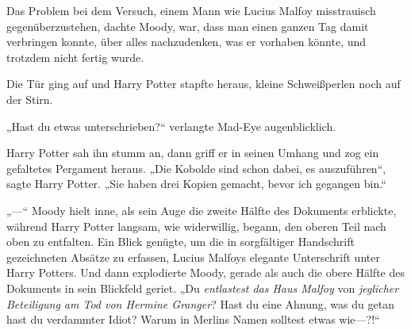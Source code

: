 Das Problem bei dem Versuch, einem Mann wie Lucius Malfoy misstrauisch gegenüberzustehen, dachte Moody, war, dass man einen ganzen Tag damit verbringen konnte, über alles nachzudenken, was er vorhaben könnte, und trotzdem nicht fertig wurde.

Die Tür ging auf und Harry Potter stapfte heraus, kleine Schweißperlen noch auf der Stirn.

„Hast du etwas unterschrieben?“ verlangte Mad-Eye augenblicklich.

Harry Potter sah ihn stumm an, dann griff er in seinen Umhang und zog ein gefaltetes Pergament heraus. „Die Kobolde sind schon dabei, es auszuführen“, sagte Harry Potter. „Sie haben drei Kopien gemacht, bevor ich gegangen bin.“

„—“
Moody hielt inne, als sein Auge die zweite Hälfte des Dokuments erblickte, während Harry Potter langsam, wie widerwillig, begann, den oberen Teil nach oben zu entfalten. Ein Blick genügte, um die in sorgfältiger Handschrift gezeichneten Absätze zu erfassen, Lucius Malfoys elegante Unterschrift unter Harry Potters. Und dann explodierte Moody, gerade als auch die obere Hälfte des Dokuments in sein Blickfeld geriet.
„Du \emph{entlastest das Haus Malfoy} von \emph{jeglicher Beteiligung am Tod von Hermine Granger}? Hast du eine Ahnung, was du getan hast du verdammter Idiot? Warum in Merlins Namen solltest etwas wie—?!“

